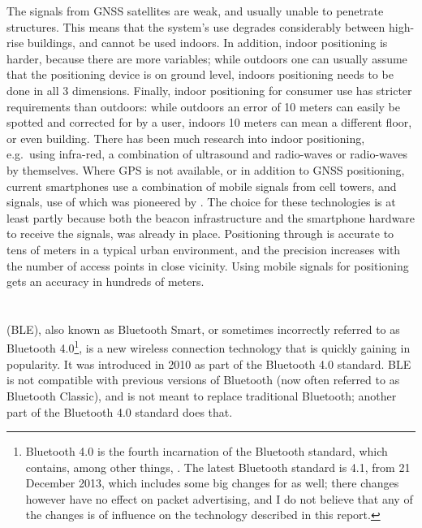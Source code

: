 The signals from GNSS satellites are weak, and usually unable to penetrate structures.
This means that the system's use degrades considerably between high-rise buildings, and cannot be used indoors.
In addition, indoor positioning is harder, because there are more variables; while outdoors one can usually assume that the positioning device is on ground level, indoors positioning needs to be done in all 3 dimensions.
Finally, indoor positioning for consumer use has stricter requirements than outdoors: while outdoors an error of 10 meters can easily be spotted and corrected for by a user, indoors 10 meters can mean a different floor, or even building. 
There has been much research into indoor positioning, e.g.\ using infra-red\citep{want1992active}, a combination of ultrasound and radio-waves\citep{harter2002anatomy,priyantha2000cricket} or radio-waves by themselves\citep{lorincz2005motetrack}.
Where GPS is not available, or in addition to GNSS positioning, current smartphones use a combination of mobile signals from cell towers, and \wifi signals, use of which was pioneered by \citet{bahl2000radar}.
The choice for these technologies is at least partly because both the beacon infrastructure and the smartphone hardware to receive the signals, was already in place.
Positioning through \wifi is accurate to tens of meters in a typical urban environment\citep{zandbergen2009accuracy}, and the precision increases with the number of access points in close vicinity.
Using mobile signals for positioning gets an accuracy in hundreds of meters.

\section{\BLE}
\BLE (BLE), also known as Bluetooth Smart, or sometimes incorrectly referred to as Bluetooth 4.0\footnote{Bluetooth 4.0 is the fourth incarnation of the Bluetooth standard, which contains, among other things, \BLE. The latest Bluetooth standard is 4.1, from 21 December 2013, which includes some big changes for \BLE as well; there changes however have no effect on packet advertising, and I do not believe that any of the changes is of influence on the technology described in this report.}, is a new wireless connection technology that is quickly gaining in popularity.
It was introduced in 2010 as part of the Bluetooth 4.0 standard.
BLE is not compatible with previous versions of Bluetooth (now often referred to as Bluetooth Classic), and is not meant to replace traditional Bluetooth; another part of the Bluetooth 4.0 standard does that.


